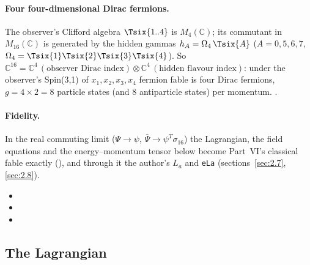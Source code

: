 \paragraph{Four four-dimensional Dirac fermions.} The observer's Clifford algebra $\Tsix{1..4}$ is
$M_4(\mathbb C)$; its commutant in $M_{16}(\mathbb C)$ is generated by the hidden gammas
$h_A=\Omega_4\,\Tsix{A}$ ($A=0,5,6,7$, $\Omega_4=\Tsix{1}\Tsix{2}\Tsix{3}\Tsix{4}$). So
$\mathbb C^{16}=\mathbb C^4\,(\text{observer Dirac index})\otimes\mathbb C^4\,(\text{hidden flavour index})$:
under the observer's Spin(3,1) of $x_1,x_2,x_3,x_4$ fermion fable is four Dirac fermions,
$g=4\times2=8$ particle states (and 8 antiparticle states) per momentum. 
.

\paragraph{Fidelity.} In the real commuting limit ($\Psi\to\psi$, $\bar\Psi\to\psi^{T}\sigma_{16}$) the
Lagrangian, the field equations and the energy--momentum tensor below become Part~VI's classical fable
exactly (), and through it the author's $L_a$ and \texttt{eLa} (sections~\ref{sec:2.7},
\ref{sec:2.8}). 
\begin{itemize}
  \item {}
  \item {}
  \item {}
\end{itemize}

\subsection{The Lagrangian}
\label{sec:3.2}

